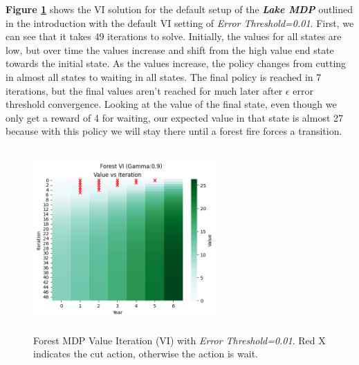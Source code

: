 \documentclass[letterpaper]{article} %
\begin{document}
\textbf{Figure \ref{fig:forest_vi}} shows the VI solution for the default setup of the  \textbf{\emph{Lake MDP}} outlined in the introduction with the default VI setting of \emph{Error Threshold=0.01}.  First, we can see that it takes 49 iterations to solve.  Initially, the values for all states are low, but over time the values increase and shift from the high value end state towards the initial state.  As the values increase, the policy changes from cutting in almost all states to waiting in all states.  The final policy is reached in 7 iterations, but the final values aren't reached for much later after  $\epsilon$ error threshold convergence.  Looking at the value of the final state, even though we only get a reward of 4 for waiting, our expected value in that state is almost 27 because with this policy we will stay there until a forest fire forces a transition. 

\begin{figure}[!htb]
\centering
\includegraphics[width=2.75in, height=2.75in]{Figures/Forest_VI_Gamma_0_9_Value_vs_Iteration.png}
\caption{Forest MDP Value Iteration (VI) with \emph{Error Threshold=0.01}. Red X indicates the cut action, otherwise the action is wait. }
\label{fig:forest_vi}
\end{figure}
\end{document}
